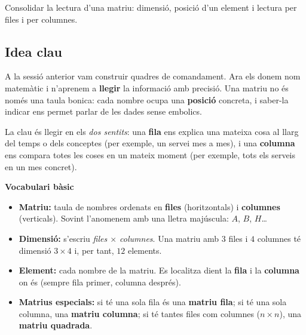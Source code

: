 %
{Consolidar la lectura d'una matriu: dimensió, posició d'un element i lectura per files i per columnes.}

\subsection{Idea clau}

A la sessió anterior vam construir quadres de comandament. Ara els donem nom
matemàtic i n'aprenem a \textbf{llegir} la informació amb precisió. Una matriu no
és només una taula bonica: cada nombre ocupa una \textbf{posició} concreta, i
saber-la indicar ens permet parlar de les dades sense embolics.

La clau és llegir en els \emph{dos sentits}: una \textbf{fila} ens explica una
mateixa cosa al llarg del temps o dels conceptes (per exemple, un servei mes a
mes), i una \textbf{columna} ens compara totes les coses en un mateix moment (per
exemple, tots els serveis en un mes concret).

\begin{idea}
\textbf{Vocabulari bàsic}
\begin{itemize}[leftmargin=1.4em, itemsep=2pt]
  \item \textbf{Matriu:} taula de nombres ordenats en \textbf{files} (horitzontals)
        i \textbf{columnes} (verticals). Sovint l'anomenem amb una lletra
        majúscula: $A$, $B$, $H$\dots
  \item \textbf{Dimensió:} s'escriu \emph{files $\times$ columnes}. Una matriu amb
        $3$ files i $4$ columnes té dimensió $3\times 4$ i, per tant, $12$ elements.
  \item \textbf{Element:} cada nombre de la matriu. Es localitza dient la
        \textbf{fila} i la \textbf{columna} on és (sempre fila primer, columna després).
  \item \textbf{Matrius especials:} si té una sola fila és una \textbf{matriu fila};
        si té una sola columna, una \textbf{matriu columna}; si té tantes files
        com columnes ($n\times n$), una \textbf{matriu quadrada}.
\end{itemize}
\end{idea}

